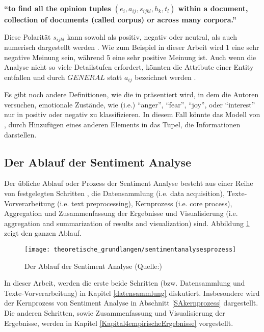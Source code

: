 \textbf{``to find all the opinion tuples $(e_i, a_{ij}, s_{ijkl}, h_k, t_l)$ within a document, collection of documents (called corpus) or across many corpora.''} \citep{liu2010sentiment}

Diese Polarität $s_{ijkl}$ kann sowohl als positiv, negativ oder neutral, als auch numerisch dargestellt werden \citep{Balazs2016}. Wie zum Beispiel in dieser Arbeit wird 1 eine sehr negative Meinung sein, während 5 eine sehr positive Meinung ist. Auch wenn die Analyse nicht so viele Detailstufen erfordert, könnten die Attribute einer Entity entfallen und durch $GENERAL$ statt $a_{ij}$ bezeichnet werden \citep{Balazs2016}.

Es gibt noch andere Definitionen, wie die in \citet{neviarouskaya2010} präsentiert wird, in dem die Autoren versuchen, emotionale Zustände, wie (\ac{i.e.}) ``anger'', ``fear'', ``joy'', oder ``interest'' nur in positiv oder negativ zu klassifizieren. In diesem Fall könnte das Modell von \citet{liu2010sentiment}, durch Hinzufügen eines anderen Elements in das Tupel, die Informationen darstellen. \citep{Balazs2016}
\subsection{Der Ablauf der Sentiment Analyse}
Der übliche Ablauf oder Prozess der Sentiment Analyse besteht aus einer Reihe von festgelegten Schritten \citep{Khan2014245,arora6734936,deyhaque2009}, die Datensammlung (\ac{i.e.} data acquisition), Texte-Vorverarbeitung (\ac{i.e.} text preprocessing), Kernprozess (\ac{i.e.} core process), Aggregation und Zusammenfassung der Ergebnisse und Visualisierung (\ac{i.e.} aggregation and summarization of results and visualization) sind. Abbildung \ref{fig:sentimentanalysesprozess} zeigt den ganzen Ablauf.
\begin{figure}[htb]
	\begin{center}
		\texttt{[image: theoretische\_grundlangen/sentimentanalysesprozess]}
		\caption[Der Ablauf der Sentiment Analyse]{Der Ablauf der Sentiment Analyse (Quelle:\citealp{Balazs2016})}
		\label{fig:sentimentanalysesprozess}
	\end{center}
\end{figure}

In dieser Arbeit, werden die erste beide Schritten (\ac{bzw.} Datensammlung und Texte-Vorverarbeitung) in Kapitel \ref{datensammlung} diskutiert. Insbesondere wird der Kernprozess von Sentiment Analyse in Abschnitt \ref{SAkernprozess} dargestellt. Die anderen Schritten, sowie Zusammenfassung und Visualisierung der Ergebnisse, werden in Kapitel \ref{Kapital4empirischeErgebnisse} vorgestellt.
